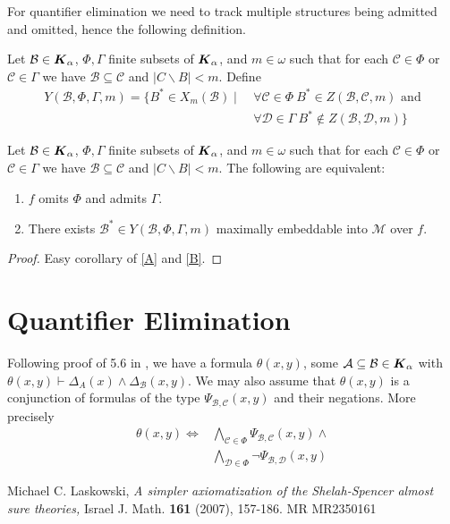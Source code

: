\documentclass{amsart}
\newcommand{\A}{\mathcal A}
\newcommand{\B}{\mathcal B}
\renewcommand{\C}{\mathcal C}
\newcommand{\D}{\mathcal D}
\newcommand{\M}{\mathcal M}
\newcommand{\K}{\boldface K_\alpha}
\begin{document}
For quantifier elimination we need to track multiple structures being admitted and omitted, hence the following definition.

\begin{Definition}
	Let $\B \in \K$, $\Phi, \Gamma$ finite subsets of $\K$, and $m \in \omega$ such that for each $\C \in \Phi$ or $\C \in \Gamma$ we have $\B \subseteq \C$ and $|C \backslash B| < m$. Define
	\begin{align*}
		Y(\B, \Phi, \Gamma, m) = \{B^* \in X_m(\B) \mid \ 	&\forall \C \in \Phi \ B^* \in Z(\B, \C, m) \text{ and}\\
																												&\forall \D \in \Gamma \ B^* \notin Z(\B, \D, m)\}
	\end{align*}
\end{Definition}

\begin{Lemma} \label{C}
	Let $\B \in \K$, $\Phi, \Gamma$ finite subsets of $\K$, and $m \in \omega$ such that for each $\C \in \Phi$ or $\C \in \Gamma$ we have $\B \subseteq \C$ and $|C \backslash B| < m$. The following are equivalent:
	\begin{enumerate}
		\item $f$ omits $\Phi$ and admits $\Gamma$.
		\item There exists $\B^* \in Y(\B, \Phi, \Gamma, m)$ maximally embeddable into $\M$ over $f$.
	\end{enumerate}
\end{Lemma}
\begin{proof}
	Easy corollary of \ref{A} and \ref{B}.
\end{proof}

\section{Quantifier Elimination}

Following proof of 5.6 in \cite{Laskowski}, we have a formula $\theta(x, y)$, some $\A \subseteq \B \in \K$ with $\theta(x, y) \vdash \Delta_A(x) \wedge \Delta_\B(x, y)$. We may also assume that $\theta(x, y)$ is a conjunction of formulas of the type $\Psi_{\B, \C}(x,y)$ and their negations. More precisely
\begin{align*}
	\theta(x, y) \Leftrightarrow 	&\bigwedge_{\C \in \Phi} \Psi_{\B, \C}(x,y) \wedge \\
																&\bigwedge_{\D \in \Phi} \neg \Psi_{\B, \D}(x,y)
\end{align*}

\begin{thebibliography}{9}

	Michael C. Laskowski, \textsl{A simpler axiomatization of the Shelah-Spencer almost sure theories,}
	Israel J. Math. \textbf{161} (2007), 157-186. MR MR2350161

\end{thebibliography}
\end{document}
